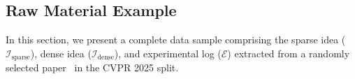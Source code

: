 \subsection{Raw Material Example}
\label{appendix:raw_material_data_example}

In this section, we present a complete data sample comprising the sparse idea ($\mathcal{I}_{\text{sparse}}$), dense idea ($\mathcal{I}_{\text{dense}}$), and experimental log ($\mathcal{E}$) extracted from a randomly selected paper~\citep{11093026} in the CVPR 2025 split.

\begin{rawmaterialbox}

\end{rawmaterialbox}

\begin{rawmaterialbox}

\end{rawmaterialbox}

\begin{rawmaterialbox}

\end{rawmaterialbox}